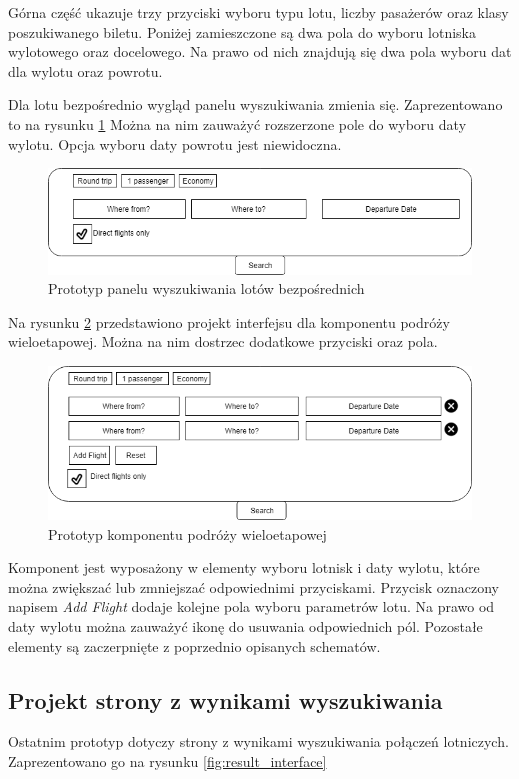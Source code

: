 \documentclass[12pt, twoside]{report}
\begin{document}
\noindent Górna część ukazuje trzy przyciski wyboru typu lotu, liczby pasażerów oraz klasy poszukiwanego biletu. Poniżej zamieszczone są dwa pola do wyboru lotniska wylotowego oraz docelowego. Na prawo od nich znajdują się dwa pola wyboru dat dla wylotu oraz powrotu.

Dla lotu bezpośrednio wygląd panelu wyszukiwania zmienia się. Zaprezentowano to na rysunku \ref{fig:interface_project_direct} Można na nim zauważyć rozszerzone pole do wyboru daty wylotu. Opcja wyboru daty powrotu jest niewidoczna.
\begin{figure}[!ht]
\centering
\includegraphics[scale=0.60, keepaspectratio]{interface_project_direct.PNG}
\caption{Prototyp panelu wyszukiwania lotów bezpośrednich}
\label{fig:interface_project_direct}
\end{figure}

Na rysunku \ref{fig:multi_travel_interface} przedstawiono projekt interfejsu dla komponentu podróży wieloetapowej. Można na nim dostrzec dodatkowe przyciski oraz pola.
\begin{figure}[!ht]
\centering
\includegraphics[scale=0.60, keepaspectratio]{multi_travel_interface.PNG}
\caption{Prototyp komponentu podróży wieloetapowej}
\label{fig:multi_travel_interface}
\end{figure}
Komponent jest wyposażony w elementy wyboru lotnisk i daty wylotu, które można zwiększać lub zmniejszać odpowiednimi przyciskami. Przycisk oznaczony napisem \textit{Add Flight} dodaje kolejne pola wyboru parametrów lotu. Na prawo od daty wylotu można zauważyć ikonę do usuwania odpowiednich pól. Pozostałe elementy są zaczerpnięte z poprzednio opisanych schematów.
\subsection{Projekt strony z wynikami wyszukiwania}
Ostatnim prototyp dotyczy strony z wynikami wyszukiwania połączeń lotniczych. Zaprezentowano go na rysunku \ref{fig:result_interface}
\end{document}
